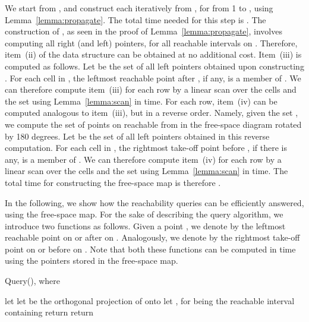 \documentclass[12pt]{dalthesis}
\def\favoritefont{\bfseries \sffamily}
\def\QED{\ensuremath{{\Box}}}
\def\markatright#1{\leavevmode\unskip\nobreak\quad\hspace*{\fill}{#1}}
\newenvironment{proof}
	{\begin{trivlist}\item[\hskip\labelsep{\favoritefont Proof:}]}
	{\markatright{\QED}\end{trivlist}}
\newcommand{\qed}{}
\newcommand{\fs}{free-space }
\begin{document}
\begin{proof}
	We start from , 
	and construct each  iteratively from , for  from 1 to ,
	using Lemma~\ref{lemma:propagate}.
	The total time needed for this step is .
	The construction of ,
	as seen in the proof of Lemma~\ref{lemma:propagate}, 
	involves computing all right (and left) pointers,
	for all reachable intervals on . 
	Therefore, item~(ii) of the data structure can be obtained at no additional cost.
	Item~(iii) is computed as follows.
	Let  be the set of all left pointers obtained upon constructing .
	For each cell  in , the leftmost reachable point after , if any, 
	is a member of . 
	We can therefore compute item~(iii) for each row 
	by a linear scan over the cells and the set  
	using Lemma~\ref{lemma:scan} in  time.
	For each row, item~(iv) can be computed analogous to item~(iii), but in a reverse order.
	Namely, given the set , we compute the set of points on 
	reachable from  in the \fs diagram rotated by 180 degrees.
	Let  be the set of all left pointers obtained in this reverse computation.
	For each cell  in , the rightmost take-off point before , if there is any, 
	is a member of . 
	We can therefore compute item~(iv) for each row 
	by a linear scan over the cells and the set  
	using Lemma~\ref{lemma:scan} in  time.
	The total time for constructing the \fs map is therefore .
	\qed
\end{proof}


In the following, we show how the reachability queries can be 
efficiently answered, using the \fs map.
For the sake of describing the query algorithm, 
we introduce two functions as follows.
Given a point ,
we denote by  the leftmost reachable point on or after  on .
Analogously, we denote by  the rightmost take-off point on or before  on .
Note that both these functions can be computed in 
time using the pointers stored in the \fs map.



\begin{algorithm} [t]
\caption {{\sc Query()}, where } 
\label{alg:query}
\begin{algorithmic}[1]
	\vspace{0.5em}
	\baselineskip
	\STATE let  \label{l:init}
		\STATE let  be the orthogonal projection of  onto   \label{l:l1}
		\STATE    \label{l:l2}
		\STATE let 
		 \label{l:c1}
			\STATE  \label{l:c2}
		\ELSE
			\STATE , for  being the reachable interval containing 
		\ENDIF 	
			\STATE return 
		\ENDIF 
	\ENDFOR 
	\STATE return 

\end{algorithmic}
\end{algorithm}
\end{document}
